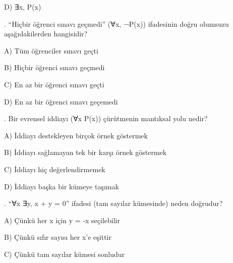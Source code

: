 \par\noindent\hspace*{1.6em}D) ∃x, P(x)

\par\smallskip{}. “Hiçbir öğrenci sınavı geçmedi” (∀x, ¬P(x)) ifadesinin doğru olumsuzu aşağıdakilerden hangisidir?

\par\noindent\hspace*{1.6em}A) Tüm öğrenciler sınavı geçti

\par\noindent\hspace*{1.6em}B) Hiçbir öğrenci sınavı geçmedi

\par\noindent\hspace*{1.6em}C) En az bir öğrenci sınavı geçti

\par\noindent\hspace*{1.6em}D) En az bir öğrenci sınavı geçemedi

\par\smallskip{}. Bir evrensel iddiayı (∀x P(x)) çürütmenin mantıksal yolu nedir?

\par\noindent\hspace*{1.6em}A) İddiayı destekleyen birçok örnek göstermek

\par\noindent\hspace*{1.6em}B) İddiayı sağlamayan tek bir karşı örnek göstermek

\par\noindent\hspace*{1.6em}C) İddiayı hiç değerlendirmemek

\par\noindent\hspace*{1.6em}D) İddiayı başka bir kümeye taşımak

\par\smallskip{}. “∀x ∃y, x + y = 0” ifadesi (tam sayılar kümesinde) neden doğrudur?

\par\noindent\hspace*{1.6em}A) Çünkü her x için y = -x seçilebilir

\par\noindent\hspace*{1.6em}B) Çünkü sıfır sayısı her x’e eşittir

\par\noindent\hspace*{1.6em}C) Çünkü tam sayılar kümesi sonludur

